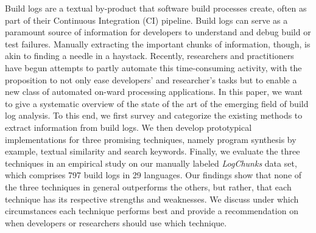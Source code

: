 Build logs are a textual by-product that software build processes
create, often as part of their Continuous Integration (CI)
pipeline.
Build logs can serve as a paramount source of
information for developers to understand and debug build or
test failures.
Manually
extracting the important chunks of information, though, is akin to
finding a needle in a haystack.
Recently, researchers and practitioners have begun attempts to partly
automate
this time-consuming activity, with the proposition to not only ease
developers' and researcher's tasks but to enable a new class of automated
on-ward processing applications.
In this paper, we want to give a systematic overview of the state of
the art of the emerging field of build log analysis.
To this end, we first survey and categorize the existing methods to
extract information from build logs.
We then develop prototypical implementations for three promising
techniques, namely program synthesis
by example, textual similarity and search keywords.
Finally, we evaluate the three techniques in an empirical study on
our manually
labeled \emph{LogChunks} data set, which comprises 797 build logs in
29 languages.
Our findings show that none of the three techniques in general outperforms
the others, but rather, that each technique has its respective strengths
and weaknesses.
We discuss under which circumstances each technique performs best
and provide a recommendation on when developers or researchers should
use which technique.
